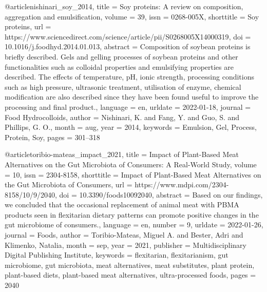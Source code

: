 @article{nishinari_soy_2014,
	title = {Soy proteins: {A} review on composition, aggregation and emulsification},
	volume = {39},
	issn = {0268-005X},
	shorttitle = {Soy proteins},
	url = {https://www.sciencedirect.com/science/article/pii/S0268005X14000319},
	doi = {10.1016/j.foodhyd.2014.01.013},
	abstract = {Composition of soybean proteins is briefly described. Gels and gelling processes of soybean proteins and other functionalities such as colloidal properties and emulsifying properties are described. The effects of temperature, pH, ionic strength, processing conditions such as high pressure, ultrasonic treatment, utilisation of enzyme, chemical modification are also described since they have been found useful to improve the processing and final product.},
	language = {en},
	urldate = {2022-01-18},
	journal = {Food Hydrocolloids},
	author = {Nishinari, K. and Fang, Y. and Guo, S. and Phillips, G. O.},
	month = aug,
	year = {2014},
	keywords = {Emulsion, Gel, Process, Protein, Soy},
	pages = {301--318}
}

@article{toribio-mateas_impact_2021,
	title = {Impact of {Plant}-{Based} {Meat} {Alternatives} on the {Gut} {Microbiota} of {Consumers}: {A} {Real}-{World} {Study}},
	volume = {10},
	issn = {2304-8158},
	shorttitle = {Impact of {Plant}-{Based} {Meat} {Alternatives} on the {Gut} {Microbiota} of {Consumers}},
	url = {https://www.mdpi.com/2304-8158/10/9/2040},
	doi = {10.3390/foods10092040},
	abstract = {Based on our findings, we concluded that the occasional replacement of animal meat with PBMA products seen in flexitarian dietary patterns can promote positive changes in the gut microbiome of consumers.},
	language = {en},
	number = {9},
	urldate = {2022-01-26},
	journal = {Foods},
	author = {Toribio-Mateas, Miguel A. and Bester, Adri and Klimenko, Natalia},
	month = sep,
	year = {2021},
	publisher = {Multidisciplinary Digital Publishing Institute},
	keywords = {flexitarian, flexitarianism, gut microbiome, gut microbiota, meat alternatives, meat substitutes, plant protein, plant-based diets, plant-based meat alternatives, ultra-processed foods},
	pages = {2040}
}

